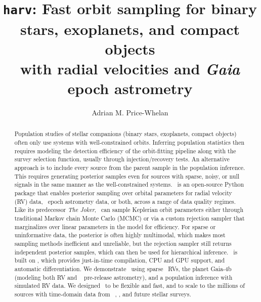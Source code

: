 \documentclass[twocolumn]{AASTeX7/aastex701}
\newcommand{\harv}{\package{harv}}
\newcommand{\joker}{\textsl{The Joker}}
\begin{document}
\title{
  \texttt{harv}:
  Fast orbit sampling for binary stars, exoplanets, and compact objects \\
  with radial velocities and \textit{Gaia} epoch astrometry
}

\author[orcid=0000-0003-0872-7098]{Adrian M. Price-Whelan}

\begin{abstract}
Population studies of stellar companions (binary stars, exoplanets, compact objects)
often only use systems with well-constrained orbits.
Inferring population statistics then requires modeling the detection efficiency of the
orbit-fitting pipeline along with the survey selection function, usually through
injection/recovery tests.
An alternative approach is to include every source from the parent sample in the
population inference.
This requires generating posterior samples even for sources with sparse, noisy, or null
signals in the same manner as the well-constrained systems.
\harv\ is an open-source Python package that enables posterior sampling over orbital
parameters for radial velocity (RV) data, \gaia\ epoch astrometry data, or both, across
a range of data quality regimes.
Like its predecessor \joker, \harv\ can sample Keplerian orbit parameters either through
traditional Markov chain Monte Carlo (MCMC) or via a custom rejection sampler that
marginalizes over linear parameters in the model for efficiency.
For sparse or uninformative data, the posterior is often highly multimodal, which makes
most sampling methods inefficient and unreliable, but the rejection sampler still
returns independent posterior samples, which can then be used for hierarchical
inference.
\harv\ is built on \jax, which provides just-in-time compilation, CPU and GPU
support, and automatic differentiation.
We demonstrate \harv\ using sparse \apogee\ RVs, the planet Gaia-4b (modeling both RV
and \gaia\  pre-release astrometry), and a population inference with simulated RV
data.
We designed \harv\ to be flexible and fast, and to scale to the millions of sources with
time-domain data from \gaia\ , \sdssv, and future stellar surveys.
\end{abstract}

\end{document}
